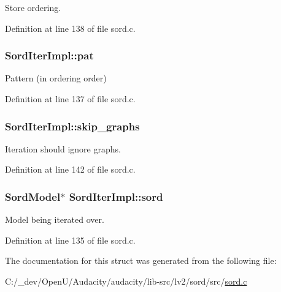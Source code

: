 Store ordering. 



Definition at line 138 of file sord.\+c.

\subsubsection[{\texorpdfstring{pat}{pat}}]{ Sord\+Iter\+Impl\+::pat}\hypertarget{struct_sord_iter_impl_ac421d0325ee1c14cbe9eb3459e232c79}{}\label{struct_sord_iter_impl_ac421d0325ee1c14cbe9eb3459e232c79}


Pattern (in ordering order) 



Definition at line 137 of file sord.\+c.

\subsubsection[{\texorpdfstring{skip\+\_\+graphs}{skip_graphs}}]{ Sord\+Iter\+Impl\+::skip\+\_\+graphs}\hypertarget{struct_sord_iter_impl_ae3b907b1696be24090d34a7f4e478cbb}{}\label{struct_sord_iter_impl_ae3b907b1696be24090d34a7f4e478cbb}


Iteration should ignore graphs. 



Definition at line 142 of file sord.\+c.

\subsubsection[{\texorpdfstring{sord}{sord}}]{ {\bf Sord\+Model}$\ast$ Sord\+Iter\+Impl\+::sord}\hypertarget{struct_sord_iter_impl_a6e78f08c329ec472f7a33c14cb627609}{}\label{struct_sord_iter_impl_a6e78f08c329ec472f7a33c14cb627609}


Model being iterated over. 



Definition at line 135 of file sord.\+c.



The documentation for this struct was generated from the following file\+:\begin{DoxyCompactItemize}
\item 
C\+:/\+\_\+dev/\+Open\+U/\+Audacity/audacity/lib-\/src/lv2/sord/src/\hyperlink{sord_8c}{sord.\+c}\end{DoxyCompactItemize}
